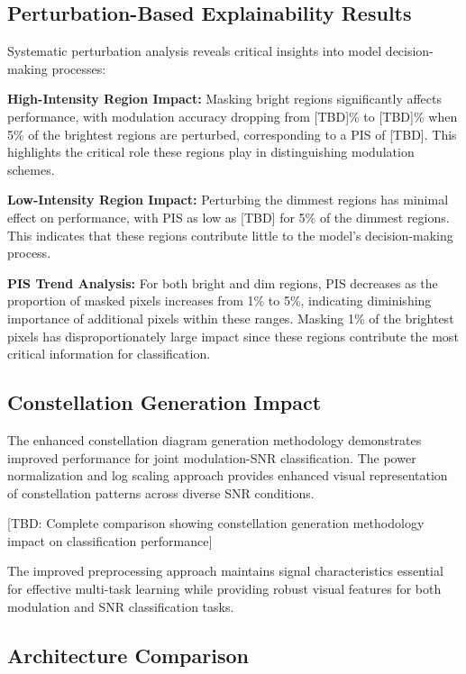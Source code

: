 \documentclass{ELSP}
\begin{document}
{{\subsection{Perturbation-Based Explainability Results}

Systematic perturbation analysis reveals critical insights into model decision-making processes:

\textbf{High-Intensity Region Impact:} Masking bright regions significantly affects performance, with modulation accuracy dropping from [TBD]\% to [TBD]\% when 5\% of the brightest regions are perturbed, corresponding to a PIS of [TBD]. This highlights the critical role these regions play in distinguishing modulation schemes.

\textbf{Low-Intensity Region Impact:} Perturbing the dimmest regions has minimal effect on performance, with PIS as low as [TBD] for 5\% of the dimmest regions. This indicates that these regions contribute little to the model's decision-making process.

\textbf{PIS Trend Analysis:} For both bright and dim regions, PIS decreases as the proportion of masked pixels increases from 1\% to 5\%, indicating diminishing importance of additional pixels within these ranges. Masking 1\% of the brightest pixels has disproportionately large impact since these regions contribute the most critical information for classification.

\subsection{Constellation Generation Impact}

The enhanced constellation diagram generation methodology demonstrates improved performance for joint modulation-SNR classification. The power normalization and log scaling approach provides enhanced visual representation of constellation patterns across diverse SNR conditions.

[TBD: Complete comparison showing constellation generation methodology impact on classification performance]

The improved preprocessing approach maintains signal characteristics essential for effective multi-task learning while providing robust visual features for both modulation and SNR classification tasks.

\subsection{Architecture Comparison}

}}
\end{document}
